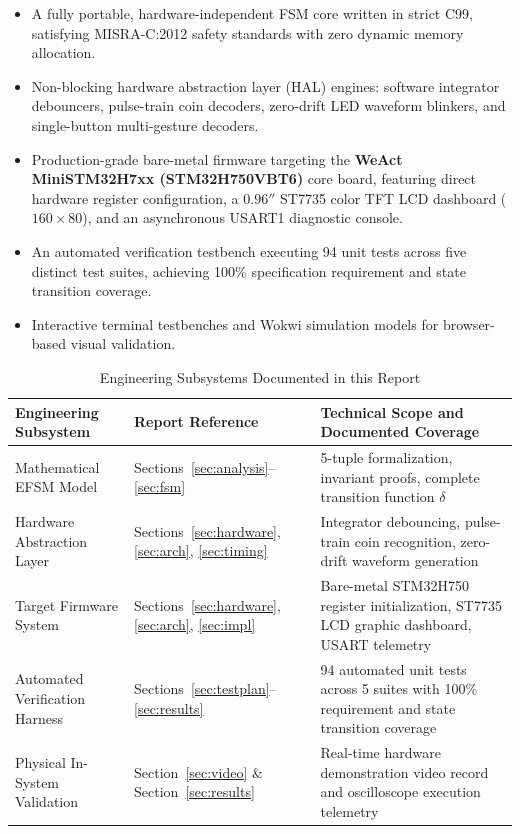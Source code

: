 \begin{itemize}
  \item A fully portable, hardware-independent FSM core written in strict C99,
    satisfying MISRA-C:2012 safety standards with zero dynamic memory allocation.
  \item Non-blocking hardware abstraction layer (HAL) engines: software integrator debouncers, pulse-train coin decoders,
    zero-drift LED waveform blinkers, and single-button multi-gesture decoders.
  \item Production-grade bare-metal firmware targeting the \textbf{WeAct MiniSTM32H7xx (STM32H750VBT6)} core board,
    featuring direct hardware register configuration, a $0.96''$ ST7735 color TFT LCD dashboard ($160\times 80$), and
    an asynchronous USART1 diagnostic console.
  \item An automated verification testbench executing 94 unit tests across five distinct test suites, achieving 100\%
    specification requirement and state transition coverage.
  \item Interactive terminal testbenches and Wokwi simulation models for browser-based visual validation.
\end{itemize}

\begin{table}[H]
  \centering
  \caption{Engineering Subsystems Documented in this Report}
  \label{tab:system_scope}
  \small
  \renewcommand{\arraystretch}{1.2}
  \begin{tabularx}{\linewidth}{L{4.6cm} C{2.4cm} Y}
    \toprule
    \textbf{Engineering Subsystem} & \textbf{Report Reference} & \textbf{Technical Scope and Documented Coverage} \\
    \midrule
    Mathematical EFSM Model & Sections~\ref{sec:analysis}--\ref{sec:fsm} & 5-tuple formalization, invariant proofs, complete transition function $\delta$ \\
    Hardware Abstraction Layer & Sections~\ref{sec:hardware}, \ref{sec:arch}, \ref{sec:timing} & Integrator debouncing, pulse-train coin recognition, zero-drift waveform generation \\
    Target Firmware System & Sections~\ref{sec:hardware}, \ref{sec:arch}, \ref{sec:impl} & Bare-metal STM32H750 register initialization, ST7735 LCD graphic dashboard, USART telemetry \\
    Automated Verification Harness & Sections~\ref{sec:testplan}--\ref{sec:results} & 94 automated unit tests across 5 suites with 100\% requirement and state transition coverage \\
    Physical In-System Validation & Section~\ref{sec:video} \& Section~\ref{sec:results} & Real-time hardware demonstration video record and oscilloscope execution telemetry \\
    \bottomrule
  \end{tabularx}
\end{table}

